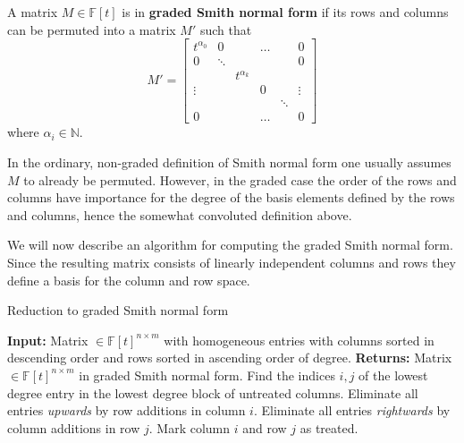 \begin{definition}
  A matrix $M \in \mathbb{F}[t]$ is in \textbf{graded Smith normal form} if its rows and columns can be permuted into a matrix $M'$ such that
  \[ M' = \begin{bmatrix}
      t^{\alpha_{0}} & 0 & & \dots & &  0\\
      0 & \ddots &  & & & 0 \\
      &   &  t^{\alpha_{k}} & & &\\
      \vdots &   &  & 0 & & \vdots \\
      &   &  &   & \ddots & \\
      0 &   & &  \dots  &  & 0
     \end{bmatrix}\]
  where $\alpha_{i} \in \mathbb{N}$.
\end{definition}
In the ordinary, non-graded definition of Smith normal form one usually assumes $M$ to already be permuted. However, in the graded case the order of the rows and columns have importance for the degree of the basis elements defined by the rows and columns, hence the somewhat convoluted definition above.

We will now describe an algorithm for computing the graded Smith normal form. Since the resulting matrix consists of linearly independent columns and rows they define a basis for the column and row space.
\begin{algorithm}[h]
\caption{Reduction to graded Smith normal form \cite{skraba, Zomorodian2005}}\label{smith}
\begin{algorithmic}[1]
  \State \textbf{Input:} Matrix $ \in \mathbb{F}[t]^{n \times m}$ with homogeneous entries with columns sorted in descending order and rows sorted in ascending order of degree.
  \State \textbf{Returns:} Matrix $ \in \mathbb{F}[t]^{n \times m}$ in graded Smith normal form.%
  \State Find the indices $i,j$ of the lowest degree entry in the lowest degree block of untreated columns.
  \State Eliminate all entries \textit{upwards} by row additions in column $i$.
  \State Eliminate all entries \textit{rightwards} by column additions in row $j$.
  \State Mark column $i$ and row $j$ as treated.
\end{algorithmic}
\end{algorithm}

